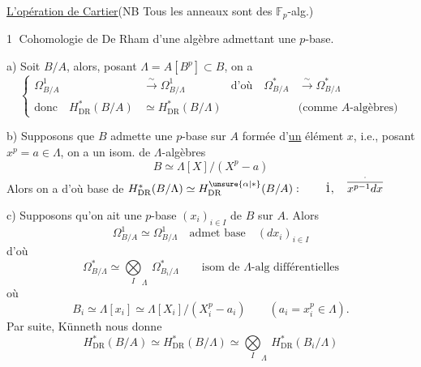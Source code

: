 \uline{L'opération de Cartier}\qquad (NB Tous les anneaux sont des $\mathbb F_p$-alg.)

\textcircled{1} Cohomologie de De Rham d'une algèbre admettant une $p$-base.

a) Soit $B/A$, alors, posant $\Lambda=A[B^p]\subset B$, on a
\[
 \left\{\begin{aligned}
 \Omega^1_{B/A}&\xrightarrow{\sim}\Omega^1_{B/\Lambda}
 &\text{d'où}\quad\Omega^*_{B/A}&\xrightarrow{\sim}\Omega^*_{B/\Lambda}\\
 \text{donc}\quad H^*_{\mathrm{DR}}(B/A)&\simeq H^*_{\mathrm{DR}}(B/\Lambda)
 &&\text{(comme $A$-algèbres)}
 \end{aligned}\right.
\]

b) Supposons que $B$ admette une $p$-base sur $A$ formée d'\uline{un} élément $x$, i.e.,  posant $x^p=a\in\Lambda$, on a un isom. de $\Lambda$-algèbres
\[
 B\simeq\Lambda[X]/(X^p-a)
\]
Alors on a
d'où base de \deleted{\unsure{$\Omega$}} $H^*_{\mathrm{DR}}(B/\Lambda)\simeq H^{\unsure{\alpha|*}}_{\mathrm{DR}}(B/A):\qquad\dot{1},\quad\overset{\cdot}{\overline{x^{p-1}dx}}$

c) Supposons qu'on ait une $p$-base $(x_i)_{i\in I}$ de $B$ sur $A$. Alors 
\[
 \Omega^1_{B/A}\simeq\Omega^1_{B/\Lambda}\quad\text{admet base}\quad (dx_i)_{i\in I}
\]
d'où
\[
 \Omega^*_{B/\Lambda}\simeq{\mathop{\bigotimes}\limits_I}_{\Lambda}\,\Omega^*_{B_i/\Lambda}
 \qquad\text{isom de $\Lambda$-alg différentielles}
\]
où
\[
 B_i\simeq\Lambda[x_i]\simeq\Lambda[X_i]/(X_i^p-a_i)
 \qquad (a_i=x_i^p\in\Lambda).
\]
Par suite, Künneth nous donne
\[
 H^*_{\mathrm{DR}}(B/A)\simeq H^*_{\mathrm{DR}}(B/\Lambda)
 \simeq{\mathop{\bigotimes}\limits_I}_{\Lambda}\,H^*_{\mathrm{DR}}(B_i/\Lambda)
\]

